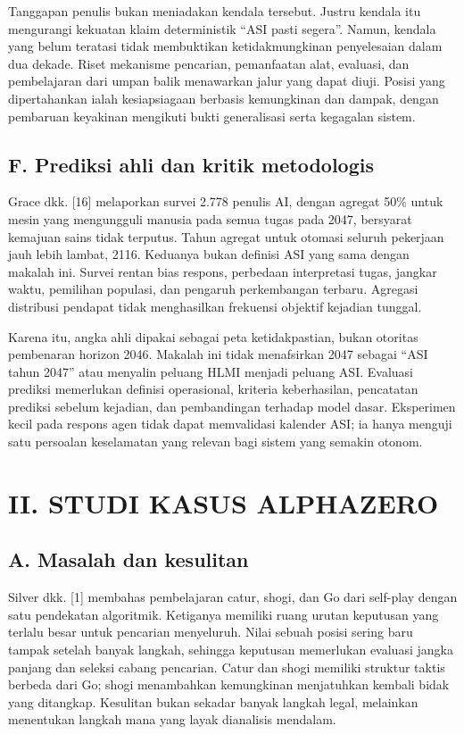 \documentclass[conference,a4paper]{IEEEtran}
\begin{document}
Tanggapan penulis bukan meniadakan kendala tersebut. Justru kendala itu mengurangi kekuatan klaim deterministik ``ASI pasti segera''. Namun, kendala yang belum teratasi tidak membuktikan ketidakmungkinan penyelesaian dalam dua dekade. Riset mekanisme pencarian, pemanfaatan alat, evaluasi, dan pembelajaran dari umpan balik menawarkan jalur yang dapat diuji. Posisi yang dipertahankan ialah kesiapsiagaan berbasis kemungkinan dan dampak, dengan pembaruan keyakinan mengikuti bukti generalisasi serta kegagalan sistem.

\subsection*{F. Prediksi ahli dan kritik metodologis}
Grace dkk. [16] melaporkan survei 2.778 penulis AI, dengan agregat 50\% untuk mesin yang mengungguli manusia pada semua tugas pada 2047, bersyarat kemajuan sains tidak terputus. Tahun agregat untuk otomasi seluruh pekerjaan jauh lebih lambat, 2116. Keduanya bukan definisi ASI yang sama dengan makalah ini. Survei rentan bias respons, perbedaan interpretasi tugas, jangkar waktu, pemilihan populasi, dan pengaruh perkembangan terbaru. Agregasi distribusi pendapat tidak menghasilkan frekuensi objektif kejadian tunggal.

Karena itu, angka ahli dipakai sebagai peta ketidakpastian, bukan otoritas pembenaran horizon 2046. Makalah ini tidak menafsirkan 2047 sebagai ``ASI tahun 2047'' atau menyalin peluang HLMI menjadi peluang ASI. Evaluasi prediksi memerlukan definisi operasional, kriteria keberhasilan, pencatatan prediksi sebelum kejadian, dan pembandingan terhadap model dasar. Eksperimen kecil pada respons agen tidak dapat memvalidasi kalender ASI; ia hanya menguji satu persoalan keselamatan yang relevan bagi sistem yang semakin otonom.

\clearpage
\section*{II. STUDI KASUS ALPHAZERO}
\subsection*{A. Masalah dan kesulitan}
Silver dkk. [1] membahas pembelajaran catur, shogi, dan Go dari self-play dengan satu pendekatan algoritmik. Ketiganya memiliki ruang urutan keputusan yang terlalu besar untuk pencarian menyeluruh. Nilai sebuah posisi sering baru tampak setelah banyak langkah, sehingga keputusan memerlukan evaluasi jangka panjang dan seleksi cabang pencarian. Catur dan shogi memiliki struktur taktis berbeda dari Go; shogi menambahkan kemungkinan menjatuhkan kembali bidak yang ditangkap. Kesulitan bukan sekadar banyak langkah legal, melainkan menentukan langkah mana yang layak dianalisis mendalam.
\end{document}
